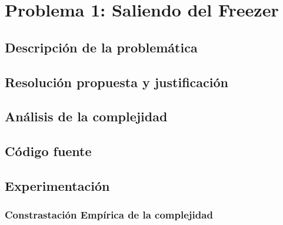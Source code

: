 \section{Problema 1: Saliendo del Freezer}

\subsection{Descripción de la problemática}

\subsection{Resolución propuesta y justificación}

\subsection{Análisis de la complejidad}

\subsection{Código fuente}

\subsection{Experimentación}

\subsubsection{Constrastación Empírica de la complejidad}